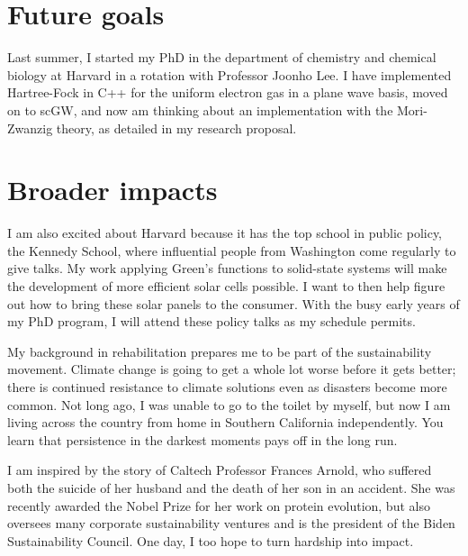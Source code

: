 \documentclass[11pt]{article} %
\begin{document}
\section{Future goals}
Last summer, I started my PhD in the department of chemistry and chemical biology at Harvard in a rotation with Professor Joonho Lee. I have implemented Hartree-Fock in C++ for the uniform electron gas in a plane wave basis, moved on to scGW, and now am thinking about an implementation with the Mori-Zwanzig theory, as detailed in my research proposal. 

\section{Broader impacts}
I am also excited about Harvard because it has the top school in public policy, the Kennedy School, where influential people from Washington come regularly to give talks. My work applying Green's functions to solid-state systems will make the development of more efficient solar cells possible. I want to then help figure out how to bring these solar panels to the consumer. With the busy early years of my PhD program, I will attend these policy talks as my schedule permits.

My background in rehabilitation prepares me to be part of the sustainability movement. Climate change is going to get a whole lot worse before it gets better; there is continued resistance to climate solutions even as disasters become more common. Not long ago, I was unable to go to the toilet by myself, but now I am living across the country from home in Southern California independently. You learn that persistence in the darkest moments pays off in the long run.

I am inspired by the story of Caltech Professor Frances Arnold, who suffered both the suicide of her husband and the death of her son in an accident. She was recently awarded the Nobel Prize for her work on protein evolution, but also oversees many corporate sustainability ventures and is the president of the Biden Sustainability Council. One day, I too hope to turn hardship into impact.


 
\end{document}
